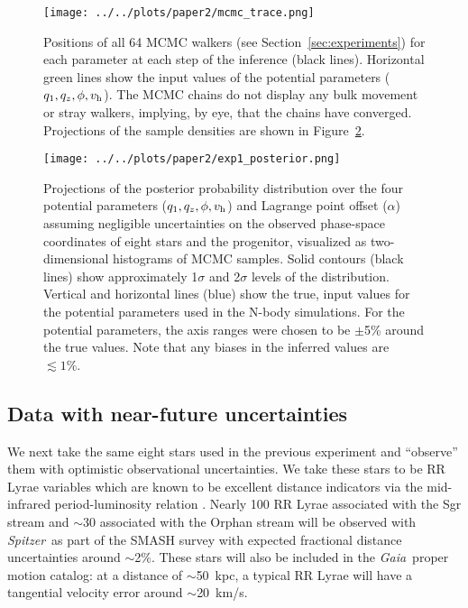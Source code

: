 \documentclass[letterpaper,12pt,preprint]{aastex}
\newcommand{\project}[1]{\textsl{#1}}
\newcommand{\gaia}{\project{Gaia}}
\newcommand{\spitzer}{\project{Spitzer}~}
\newcommand{\vhalo}{v_{\rm h}}
\newcommand{\potp}{$q_1,q_z,\phi,\vhalo$}
\begin{document}
\begin{figure}[!ht]
\begin{center}
\texttt{[image: ../../plots/paper2/mcmc\_trace.png]}
\caption{ Positions of all 64 MCMC walkers (see Section~\ref{sec:experiments}) for each parameter at each step of the inference (black lines). Horizontal green lines show the input values of the potential parameters (\potp). The MCMC chains do not display any bulk movement or stray walkers, implying, by eye, that the chains have converged. Projections of the sample densities are shown in Figure~\ref{fig:exp1_posterior}. }\label{fig:trace}
\end{center}
\end{figure}

\begin{figure}[!ht]
\begin{center}
\texttt{[image: ../../plots/paper2/exp1\_posterior.png]}
\caption{ Projections of the posterior probability distribution over the four potential parameters (\potp) and Lagrange point offset ($\alpha$) assuming negligible uncertainties on the observed phase-space coordinates of eight stars and the progenitor, visualized as two-dimensional histograms of MCMC samples. Solid contours (black lines) show approximately 1$\sigma$ and 2$\sigma$ levels of the distribution. Vertical and horizontal lines (blue) show the true, input values for the potential parameters used in the N-body simulations. For the potential parameters, the axis ranges were chosen to be $\pm$5\% around the true values. Note that any biases in the inferred values are $\lesssim1\%$. }\label{fig:exp1_posterior}
\end{center}
\end{figure}

\subsection{Data with near-future uncertainties}\label{sec:exp2}
We next take the same eight stars used in the previous experiment and ``observe'' them with optimistic observational uncertainties. We take these stars to be RR Lyrae variables which are known to be excellent distance indicators via the mid-infrared period-luminosity relation \citep[as shown in, e.g.,][]{madore12}. Nearly 100 RR Lyrae associated with the Sgr stream and $\sim$30 associated with the Orphan stream will be observed with \spitzer as part of the SMASH survey \citep{smashprop} with expected fractional distance uncertainties around $\sim$2\%. These stars will also be included in the \gaia\, proper motion catalog: at a distance of $\sim$50~kpc, a typical RR Lyrae will have a tangential velocity error around $\sim$20~km/s.
\end{document}
